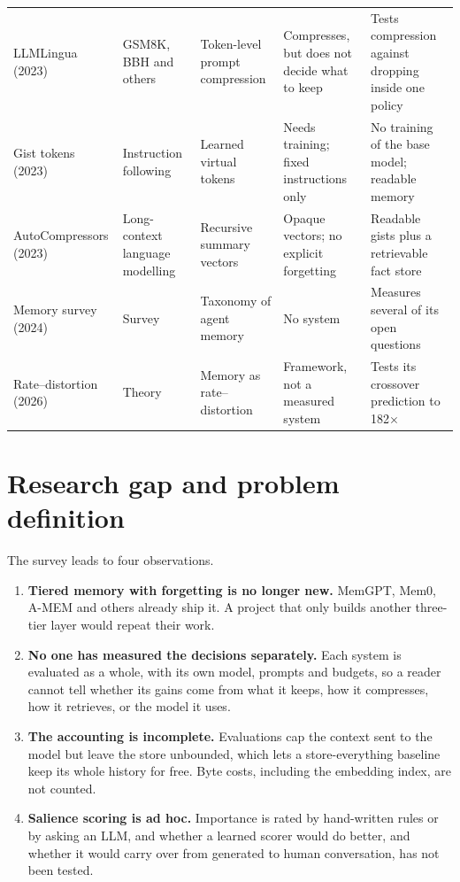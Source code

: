 {\begin{longtable}{@{}>{\raggedright\arraybackslash}p{2.3cm}>{\raggedright\arraybackslash}p{2.3cm}>{\raggedright\arraybackslash}p{2.7cm}>{\raggedright\arraybackslash}p{2.6cm}>{\raggedright\arraybackslash}p{2.7cm}@{}}
LLMLingua \cite{jiang2023llmlingua} (2023) & GSM8K, BBH and others & Token-level prompt compression & Compresses, but does not decide what to keep & Tests compression against dropping inside one policy \\
Gist tokens \cite{mu2023gist} (2023) & Instruction following & Learned virtual tokens & Needs training; fixed instructions only & No training of the base model; readable memory \\
AutoCompressors \cite{chevalier2023autocompressor} (2023) & Long-context language modelling & Recursive summary vectors & Opaque vectors; no explicit forgetting & Readable gists plus a retrievable fact store \\
Memory survey \cite{zhang2024memorysurvey} (2024) & Survey & Taxonomy of agent memory & No system & Measures several of its open questions \\
Rate--distortion \cite{colaco2026rd} (2026) & Theory & Memory as rate--distortion & Framework, not a measured system & Tests its crossover prediction to 182$\times$ \\
\bottomrule
\end{longtable}}

\section{Research gap and problem definition}
\label{sec:gap}

The survey leads to four observations.
\begin{enumerate}
\item \textbf{Tiered memory with forgetting is no longer new.} MemGPT, Mem0,
  A-MEM and others already ship it. A project that only builds another
  three-tier layer would repeat their work.
\item \textbf{No one has measured the decisions separately.} Each system is
  evaluated as a whole, with its own model, prompts and budgets, so a reader
  cannot tell whether its gains come from what it keeps, how it compresses,
  how it retrieves, or the model it uses.
\item \textbf{The accounting is incomplete.} Evaluations cap the context sent
  to the model but leave the store unbounded, which lets a store-everything
  baseline keep its whole history for free. Byte costs, including the
  embedding index, are not counted.
\item \textbf{Salience scoring is ad hoc.} Importance is rated by hand-written
  rules or by asking an LLM, and whether a learned scorer would do better, and
  whether it would carry over from generated to human conversation, has not
  been tested.
\end{enumerate}

